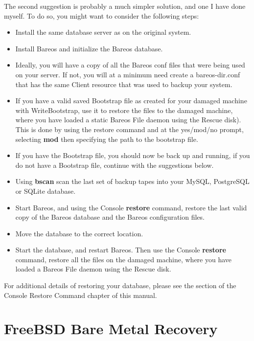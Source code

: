 The second suggestion is probably a much simpler solution, and one I have done
myself. To do so, you might want to consider the following steps:

\begin{itemize}
\item Install the same database server as on the original system.
\item Install Bareos and initialize the Bareos database.
\item Ideally, you will have a copy of all the Bareos conf files that
   were being used on your server. If not, you will at a minimum need
   create a bareos-dir.conf that has the same Client resource that
   was used to backup your system.
\item If you have a valid saved Bootstrap file as created for your damaged
   machine with WriteBootstrap, use it to restore the files to the damaged
   machine, where you have loaded a static Bareos File daemon using the
   Rescue disk).  This is done by using the restore command and at
   the yes/mod/no prompt, selecting {\bf mod} then specifying the path to
   the bootstrap file.
\item If you have the Bootstrap file, you should now be back up and  running,
   if you do not have a Bootstrap file, continue with the  suggestions below.
\item Using {\bf bscan} scan the last set of backup tapes into your  MySQL,
   PostgreSQL or SQLite database.
\item Start Bareos, and using the Console {\bf restore} command,  restore the
   last valid copy of the Bareos database and the Bareos configuration
   files.
\item Move the database to the correct location.
\item Start the database, and restart Bareos. Then use the Console {\bf
   restore} command, restore all the files  on the damaged machine, where you
   have loaded a Bareos File  daemon using the Rescue disk.
\end{itemize}

For additional details of restoring your database, please see the
 section
of the Console Restore Command chapter of this manual.



\section{FreeBSD Bare Metal Recovery}
\label{FreeBSD1}

